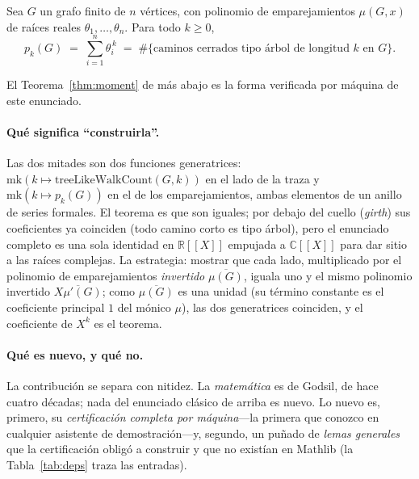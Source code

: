 \documentclass[11pt]{article}
\newcommand{\R}{\mathbb{R}}
\newcommand{\C}{\mathbb{C}}
\providecommand{\llbracket}{[\![}
\providecommand{\rrbracket}{]\!]}
\begin{document}
\begin{classicalbox}
Sea $G$ un grafo finito de $n$ v\'ertices, con polinomio de emparejamientos $\mu(G,x)$ de ra\'ices
reales $\theta_1,\dots,\theta_n$. Para todo $k\ge0$,
\[
  p_k(G)\;=\;\sum_{i=1}^{n}\theta_i^{\,k}\;=\;\#\{\text{caminos cerrados tipo \'arbol de longitud }k\text{ en }G\}.
\]
\end{classicalbox}
\noindent El Teorema~\ref{thm:moment} de m\'as abajo es la forma verificada por m\'aquina de este
enunciado.

\paragraph{Qu\'e significa ``construirla''.} Las dos mitades son dos funciones generatrices:
$\mathrm{mk}(k\mapsto\mathrm{treeLikeWalkCount}(G,k))$ en el lado de la traza y $\mathrm{mk}(k\mapsto
p_k(G))$ en el de los emparejamientos, ambas elementos de un anillo de series formales. El teorema es
que son iguales; por debajo del cuello (\emph{girth}) sus coeficientes ya coinciden (todo camino corto
es tipo \'arbol), pero el enunciado completo es una sola identidad en $\R\llbracket X\rrbracket$
empujada a $\C\llbracket X\rrbracket$ para dar sitio a las ra\'ices complejas. La estrategia: mostrar
que cada lado, multiplicado por el polinomio de emparejamientos \emph{invertido} $\overline{\mu(G)}$,
iguala uno y el mismo polinomio invertido $\overline{X\mu'(G)}$; como $\overline{\mu(G)}$ es una unidad
(su t\'ermino constante es el coeficiente principal $1$ del m\'onico $\mu$), las dos generatrices
coinciden, y el coeficiente de $X^k$ es el teorema.

\paragraph{Qu\'e es nuevo, y qu\'e no.} La contribuci\'on se separa con nitidez. La \emph{matem\'atica}
es de Godsil, de hace cuatro d\'ecadas; nada del enunciado cl\'asico de arriba es nuevo. Lo nuevo es,
primero, su \emph{certificaci\'on completa por m\'aquina}---la primera que conozco en cualquier
asistente de demostraci\'on---y, segundo, un pu\~nado de \emph{lemas generales} que la certificaci\'on
oblig\'o a construir y que no exist\'ian en Mathlib (la Tabla~\ref{tab:deps} traza las entradas).
\end{document}

